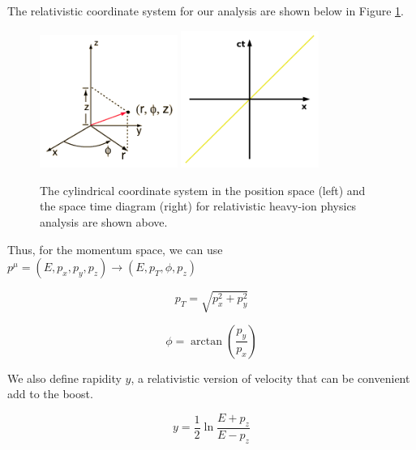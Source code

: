 The relativistic coordinate system for our analysis are shown below in Figure \ref{HICoordinates}. 

\begin{figure}[hbtp]
\begin{center}
\includegraphics[width=0.40\textwidth]{Figures/Chapter1/PosCylindrical.png}
\includegraphics[width=0.40\textwidth]{Figures/Chapter1/STDiagram.png}
\caption{The cylindrical coordinate system in the position space (left) and the space time diagram (right) for relativistic heavy-ion physics analysis are shown above.}
\label{HICoordinates}
\end{center}
\end{figure} 


Thus, for the momentum space, we can use $p^\mu = (E,p_x, p_y, p_z) \rightarrow  (E,p_T, \phi, p_z)$ 

\begin{equation}
p_T = \sqrt{p_x^2 + p_y^2}
\end{equation}

\begin{equation}
\phi = \arctan(\frac{p_y}{p_x})
\end{equation}

We also define rapidity $y$, a relativistic version of velocity that can be convenient add to the boost.

\begin{equation}
y = \frac{1}{2} \ln \frac{E+p_z}{E-p_z}
\end{equation}


